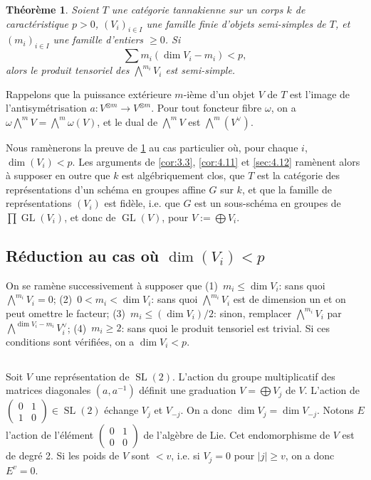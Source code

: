 \documentclass[11pt,a4paper]{article}
\theoremstyle{plain}
\newtheorem{theorem}{Th\'eor\`eme}[section]
\theoremstyle{definition}
\DeclareMathOperator{\GL}{GL}
\DeclareMathOperator{\SL}{SL}
\begin{document}
\begin{theorem}\label{thm:5.1}
Soient $T$ une cat\'egorie tannakienne sur un corps $k$ de caract\'eristique $p > 0$, $(V_i)_{i \in I}$ une famille finie d'objets semi-simples de $T$, et $(m_i)_{i \in I}$ une famille d'entiers $\geq 0$. Si
\begin{equation}\label{eq:5.1.1}
\sum m_i(\dim V_i - m_i) < p,
\end{equation}
alors le produit tensoriel des $\bigwedge^{m_i} V_i$ est semi-simple.
\end{theorem}

Rappelons que la puissance ext\'erieure $m$-i\`eme d'un objet $V$ de $T$ est l'image de l'antisym\'etrisation $a: V^{\otimes m} \to V^{\otimes m}$. Pour tout foncteur fibre $\omega$, on a $\omega \bigwedge^m V = \bigwedge^m \omega(V)$, et le dual de $\bigwedge^m V$ est $\bigwedge^m (V^\vee)$.

Nous ram\`enerons la preuve de \ref{thm:5.1} au cas particulier o\`u, pour chaque $i$, $\dim(V_i) < p$. Les arguments de \ref{cor:3.3}, \ref{cor:4.11} et \ref{sec:4.12} ram\`enent alors \`a supposer en outre que $k$ est alg\'ebriquement clos, que $T$ est la cat\'egorie des repr\'esentations d'un sch\'ema en groupes affine $G$ sur $k$, et que la famille de repr\'esentations $(V_i)$ est fid\`ele, i.e. que $G$ est un sous-sch\'ema en groupes de $\prod \GL(V_i)$, et donc de $\GL(V)$, pour $V := \bigoplus V_i$.

\subsection{R\'eduction au cas o\`u $\dim(V_i) < p$}\label{sec:5.2}

On se ram\`ene successivement \`a supposer que (1)~$m_i \leq \dim V_i$: sans quoi $\bigwedge^{m_i} V_i = 0$; (2)~$0 < m_i < \dim V_i$: sans quoi $\bigwedge^{m_i} V_i$ est de dimension un et on peut omettre le facteur; (3)~$m_i \leq (\dim V_i)/2$: sinon, remplacer $\bigwedge^{m_i} V_i$ par $\bigwedge^{\dim V_i - m_i} V_i^\vee$; (4)~$m_i \geq 2$: sans quoi le produit tensoriel est trivial. Si ces conditions sont v\'erifi\'ees, on a $\dim V_i < p$.

\subsection{}
Soit $V$ une repr\'esentation de $\SL(2)$. L'action du groupe multiplicatif des matrices diagonales $(a, a^{-1})$ d\'efinit une graduation $V = \bigoplus V_j$ de $V$. L'action de $\begin{pmatrix} 0 & 1 \\ 1 & 0 \end{pmatrix} \in \SL(2)$ \'echange $V_j$ et $V_{-j}$. On a donc $\dim V_j = \dim V_{-j}$. Notons $E$ l'action de l'\'el\'ement $\begin{pmatrix} 0 & 1 \\ 0 & 0 \end{pmatrix}$ de l'alg\`ebre de Lie. Cet endomorphisme de $V$ est de degr\'e 2. Si les poids de $V$ sont $< v$, i.e. si $V_j = 0$ pour $|j| \geq v$, on a donc $E^v = 0$.
\end{document}
